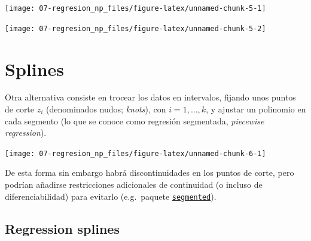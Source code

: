 \documentclass[
  spanish,
]{book}
\newenvironment{Shaded}{\begin{snugshade}}{\end{snugshade}}
\newcommand{\AttributeTok}[1]{\textcolor[rgb]{0.77,0.63,0.00}{#1}}
\newcommand{\CommentTok}[1]{\textcolor[rgb]{0.56,0.35,0.01}{\textit{#1}}}
\newcommand{\FunctionTok}[1]{\textcolor[rgb]{0.00,0.00,0.00}{#1}}
\newcommand{\NormalTok}[1]{#1}
\newcommand{\OtherTok}[1]{\textcolor[rgb]{0.56,0.35,0.01}{#1}}
\newcommand{\SpecialCharTok}[1]{\textcolor[rgb]{0.00,0.00,0.00}{#1}}
\newcommand{\StringTok}[1]{\textcolor[rgb]{0.31,0.60,0.02}{#1}}
\theoremstyle{break}
\theoremstyle{definition}
\theoremstyle{definition}
\theoremstyle{definition}
\theoremstyle{definition}
\theoremstyle{remark}
\begin{document}
\begin{center}\texttt{[image: 07-regresion\_np\_files/figure-latex/unnamed-chunk-5-1]} \end{center}

\begin{Shaded}
\end{Shaded}

\begin{center}\texttt{[image: 07-regresion\_np\_files/figure-latex/unnamed-chunk-5-2]} \end{center}

\hypertarget{splines}{%
\section{Splines}\label{splines}}

Otra alternativa consiste en trocear los datos en intervalos, fijando unos puntos de corte \(z_i\) (denominados nudos; \emph{knots}), con \(i = 1, \ldots, k\), y ajustar un polinomio en cada segmento (lo que se conoce como regresión segmentada, \emph{piecewise regression}).

\begin{center}\texttt{[image: 07-regresion\_np\_files/figure-latex/unnamed-chunk-6-1]} \end{center}

De esta forma sin embargo habrá discontinuidades en los puntos de corte, pero podrían añadirse restricciones adicionales de continuidad (o incluso de diferenciabilidad) para evitarlo (e.g.~paquete \href{https://CRAN.R-project.org/package=segmented}{\texttt{segmented}}).

\hypertarget{reg-splines}{%
\subsection{Regression splines}\label{reg-splines}}
\end{document}
